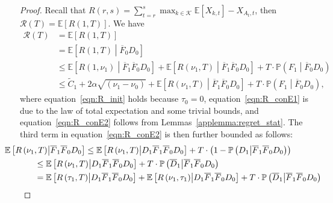 \documentclass[twoside]{article}
\def\eqref#1{equation~\ref{#1}}
\def\gK{{\mathcal{K}}}
\def\gR{{\mathcal{R}}}
\newcommand{\E}{\mathbb{E}}
\theoremstyle{plain}
\theoremstyle{definition}
\theoremstyle{remark}
\begin{document}
\begin{proof}
    Recall that $R\left(r,s\right)=\sum^{s}_{t=r}\max_{k\in\gK}\E\left[X_{k,t}\right]-X_{A_{t},t}$, then  $\gR\left(T\right)=\E\left[R\left(1,T\right)\right]$. We have
    \begin{subequations}
        \label{10}
        \begin{align}
            \gR\left(T\right)&=\E\left[R\left(1,T\right)\right]\\
            &=\E\left[R\left(1,T\right)\middle|\overline{F}_{0}D_{0}\right] \label{eqn:R_init}\\
            &\leq \E\left[R\left(1,\nu_{1}\right)\middle|\overline{F}_{1}\overline{F}_{0}D_{0}\right]+\E\left[R\left(\nu_{1},T\right)\middle|\overline{F}_{1}\overline{F}_{0}D_{0}\right]+ T\cdot \mathbb{P}\left(F_{1}\middle| \overline{F}_{0}D_{0}\right)\label{eqn:R_conE1}\\
            &\leq  \tilde{C}_{1}+2\alpha\sqrt{\left(\nu_{1}-\nu_{0}\right)}+\E\left[R\left(\nu_{1},T\right)\middle| \overline{F}_{1}\overline{F}_{0}D_{0}\right]+T\cdot \mathbb{P}\left(F_{1}\middle| \overline{F}_{0}D_{0}\right),\label{eqn:R_conE2}
        \end{align}
    \end{subequations}
    where \eqref{eqn:R_init} holds because $\tau_{0}=0$, \eqref{eqn:R_conE1} is due to the law of total expectation and some trivial bounds, and
    \eqref{eqn:R_conE2} follows from Lemmas~\ref{applemma:regret_stat}. The third term in \eqref{eqn:R_conE2} is then further bounded as follows:
    \begin{subequations}
        \begin{align}
            \hspace{-20pt}\E\left[R\left(\nu_{1},T\right)\middle| \overline{F}_{1}\overline{F}_{0}D_{0}\right] 
            &\leq\E\left[R\left(\nu_{1},T\right)\middle| D_{1}\overline{F}_{1}\overline{F}_{0}D_{0}\right]+T\cdot \left(1-\mathbb{P}\left(D_{1}\middle| \overline{F}_{1}\overline{F}_{0}D_{0}\right)\right)\label{eqn:R_conF1}\\
            &\hspace{-60pt}\leq \E\left[R\left(\nu_{1},T\right)\middle| D_{1}\overline{F}_{1}\overline{F}_{0}D_{0}\right] + T\cdot\mathbb{P}\left(\overline{D}_{1}\middle| \overline{F}_{1}\overline{F}_{0}D_{0}\right)\label{eqn:R_conF2}\\     
            &\hspace{-60pt}= \E\left[R\left(\tau_{1},T\right)\middle| D_{1}\overline{F}_{1}\overline{F}_{0}D_{0}\right]+\E\left[R\left(\nu_{1},\tau_{1}\right)\middle| D_{1}\overline{F}_{1}\overline{F}_{0}D_{0}\right]+T\cdot\mathbb{P}\left(\overline{D}_{1}\middle| \overline{F}_{1}\overline{F}_{0}D_{0}\right)\label{eqn:reg_split1}\\

\end{align}
\end{subequations}
\end{proof}
\end{document}
